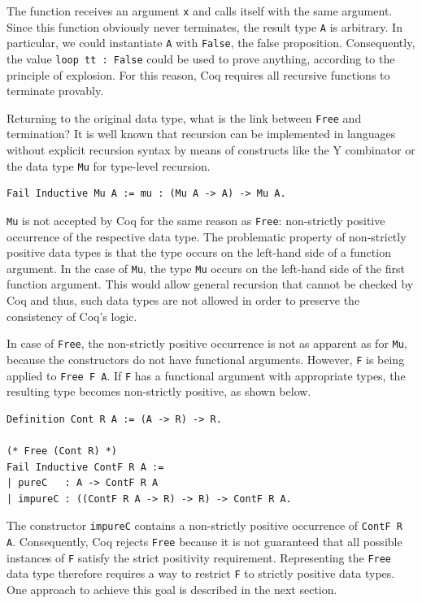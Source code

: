 \documentclass[a4paper, 11pt, fleqn, twoside]{scrreprt}
\newcommand{\cinl}[1]{\texttt{#1}}
\begin{document}
The function receives an argument \cinl{x} and calls itself with the same argument.
Since this function obviously never terminates, the result type \cinl{A} is arbitrary.
In particular, we could instantiate \cinl{A} with \cinl{False}, the false proposition.
Consequently, the value \cinl{loop tt : False} could be used to prove anything, according to the principle of explosion.
For this reason, Coq requires all recursive functions to terminate provably.

Returning to the original data type, what is the link between \cinl{Free} and termination?
It is well known that recursion can be implemented in languages without explicit recursion syntax by means of constructs like the Y combinator or the data type \texttt{Mu} for type-level recursion.

\begin{verbatim}
Fail Inductive Mu A := mu : (Mu A -> A) -> Mu A.
\end{verbatim}

\cinl{Mu} is not accepted by Coq for the same reason as \cinl{Free}: non-strictly positive occurrence of the respective data type.
The problematic property of non-strictly positive data types is that the type occurs on the left-hand side of a function argument.
In the case of \cinl{Mu}, the type \cinl{Mu} occurs on the left-hand side of the first function argument.
This would allow general recursion that cannot be checked by Coq and thus, such data types are not allowed in order to preserve the consistency of Coq's logic.

In case of \cinl{Free}, the non-strictly positive occurrence is not as apparent as for \cinl{Mu}, because the constructors do not have functional arguments.
However, \cinl{F} is being applied to \texttt{Free F A}.
If \texttt{F} has a functional argument with appropriate types, the resulting type becomes non-strictly positive, as shown below.

\begin{verbatim}
Definition Cont R A := (A -> R) -> R.

(* Free (Cont R) *)
Fail Inductive ContF R A :=
| pureC   : A -> ContF R A
| impureC : ((ContF R A -> R) -> R) -> ContF R A.
\end{verbatim}

The constructor \texttt{impureC} contains a non-strictly positive occurrence of \texttt{ContF R A}.
Consequently, Coq rejects \texttt{Free} because it is not guaranteed that all possible instances of \cinl{F} satisfy the strict positivity requirement.
Representing the \texttt{Free} data type therefore requires a way to restrict \cinl{F} to strictly positive data types.
One approach to achieve this goal is described in the next section.
\end{document}
